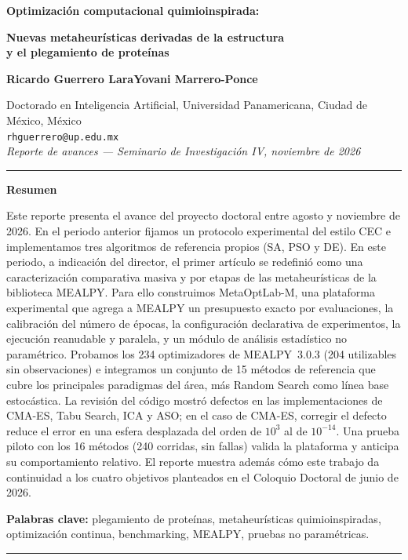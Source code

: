 \documentclass[11pt,letterpaper]{article}
\begin{document}
\begin{center}
{\LARGE\bfseries Optimización computacional quimioinspirada:\par}
\vspace{4pt}
{\large\bfseries Nuevas metaheurísticas derivadas de la estructura\\ y el plegamiento de proteínas\par}
\vspace{14pt}
{\large\bfseries Ricardo Guerrero Lara\qquad Yovani Marrero-Ponce\par}
\vspace{6pt}
Doctorado en Inteligencia Artificial, Universidad Panamericana, Ciudad de México, México\\[6pt]
\texttt{rhguerrero@up.edu.mx}\\[8pt]
\textit{Reporte de avances --- Seminario de Investigación IV, noviembre de 2026}
\end{center}
\vspace{2pt}
\noindent\rule{\textwidth}{0.4pt}

\begin{center}
\begin{minipage}{0.86\textwidth}
{\centering\textbf{Resumen}\par}\vspace{4pt}
\small
Este reporte presenta el avance del proyecto doctoral entre agosto y noviembre de 2026. En el periodo anterior fijamos un protocolo experimental del estilo CEC e implementamos tres algoritmos de referencia propios (SA, PSO y DE). En este periodo, a indicación del director, el primer artículo se redefinió como una caracterización comparativa masiva y por etapas de las metaheurísticas de la biblioteca MEALPY. Para ello construimos MetaOptLab-M, una plataforma experimental que agrega a MEALPY un presupuesto exacto por evaluaciones, la calibración del número de épocas, la configuración declarativa de experimentos, la ejecución reanudable y paralela, y un módulo de análisis estadístico no paramétrico. Probamos los 234 optimizadores de MEALPY~3.0.3 (204 utilizables sin observaciones) e integramos un conjunto de 15 métodos de referencia que cubre los principales paradigmas del área, más Random Search como línea base estocástica. La revisión del código mostró defectos en las implementaciones de CMA-ES, Tabu Search, ICA y ASO; en el caso de CMA-ES, corregir el defecto reduce el error en una esfera desplazada del orden de $10^{3}$ al de $10^{-14}$. Una prueba piloto con los 16 métodos (240 corridas, sin fallas) valida la plataforma y anticipa su comportamiento relativo. El reporte muestra además cómo este trabajo da continuidad a los cuatro objetivos planteados en el Coloquio Doctoral de junio de 2026.

\vspace{6pt}
\noindent\textbf{Palabras clave:} plegamiento de proteínas, metaheurísticas quimioinspiradas, optimización continua, benchmarking, MEALPY, pruebas no paramétricas.
\end{minipage}
\end{center}
\noindent\rule{\textwidth}{0.4pt}
\end{document}
